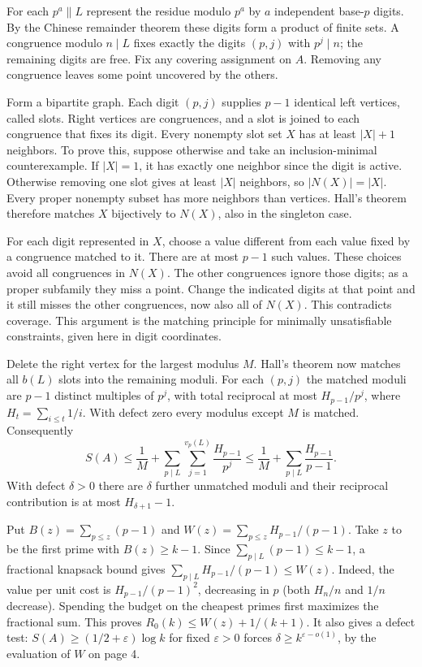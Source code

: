 \documentclass[11pt]{article}
\newcommand{\head}[1]{\vspace{4pt}{\large\bfseries\color{ink}#1}\par}
\begin{document}
\newpage
\head{1. A matching bound for the reciprocal sum}
For each $p^a\parallel L$ represent the residue modulo $p^a$ by $a$ independent base-$p$ digits. By the Chinese remainder theorem these digits form a product of finite sets. A congruence modulo $n\mid L$ fixes exactly the digits $(p,j)$ with $p^j\mid n$; the remaining digits are free. Fix any covering assignment on $A$. Removing any congruence leaves some point uncovered by the others.

Form a bipartite graph. Each digit $(p,j)$ supplies $p-1$ identical left vertices, called slots. Right vertices are congruences, and a slot is joined to each congruence that fixes its digit. Every nonempty slot set $X$ has at least $|X|+1$ neighbors. To prove this, suppose otherwise and take an inclusion-minimal counterexample. If $|X|=1$, it has exactly one neighbor since the digit is active. Otherwise removing one slot gives at least $|X|$ neighbors, so $|N(X)|=|X|$. Every proper nonempty subset has more neighbors than vertices. Hall's theorem therefore matches $X$ bijectively to $N(X)$, also in the singleton case.

For each digit represented in $X$, choose a value different from each value fixed by a congruence matched to it. There are at most $p-1$ such values. These choices avoid all congruences in $N(X)$. The other congruences ignore those digits; as a proper subfamily they miss a point. Change the indicated digits at that point and it still misses the other congruences, now also all of $N(X)$. This contradicts coverage. This argument is the matching principle for minimally unsatisfiable constraints, given here in digit coordinates.

Delete the right vertex for the largest modulus $M$. Hall's theorem now matches all $b(L)$ slots into the remaining moduli. For each $(p,j)$ the matched moduli are $p-1$ distinct multiples of $p^j$, with total reciprocal at most $H_{p-1}/p^j$, where $H_t=\sum_{i\le t}1/i$. With defect zero every modulus except $M$ is matched. Consequently
\[
 S(A)\le \frac1M+\sum_{p\mid L}\sum_{j=1}^{v_p(L)}\frac{H_{p-1}}{p^j}
 \le \frac1M+\sum_{p\mid L}\frac{H_{p-1}}{p-1}.
\]
With defect $\delta>0$ there are $\delta$ further unmatched moduli and their reciprocal contribution is at most $H_{\delta+1}-1$.

Put $B(z)=\sum_{p\le z}(p-1)$ and $W(z)=\sum_{p\le z}H_{p-1}/(p-1)$. Take $z$ to be the first prime with $B(z)\ge k-1$. Since $\sum_{p\mid L}(p-1)\le k-1$, a fractional knapsack bound gives $\sum_{p\mid L}H_{p-1}/(p-1)\le W(z)$. Indeed, the value per unit cost is $H_{p-1}/(p-1)^2$, decreasing in $p$ (both $H_n/n$ and $1/n$ decrease). Spending the budget on the cheapest primes first maximizes the fractional sum. This proves $R_0(k)\le W(z)+1/(k+1)$. It also gives a defect test: $S(A)\ge(1/2+\varepsilon)\log k$ for fixed $\varepsilon>0$ forces $\delta\ge k^{\varepsilon-o(1)}$, by the evaluation of $W$ on page 4.
\end{document}
